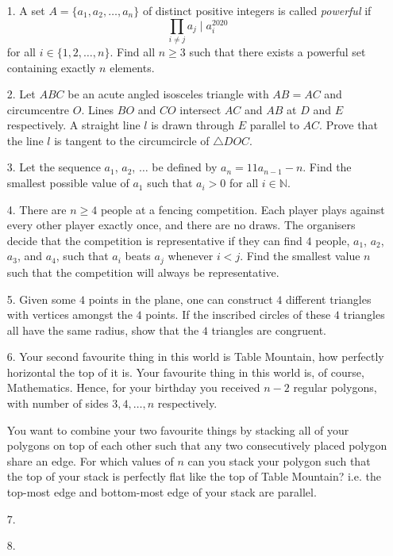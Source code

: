 \documentclass{article}
\begin{document}
\begin{enumerate}

\bigskip
\item[1.] %
A set $A = \{a_1, a_2, \dotsc, a_n\}$ of distinct positive integers is called \emph{powerful} if
\[ \prod_{i \neq j} a_j \mid a_i^{2020} \]
for all $i \in \{1, 2, \dotsc, n\}$.
Find all $n \ge 3$ such that there exists a powerful set containing exactly $n$ elements.


\medskip
\item[2.] %
Let $ABC$ be an acute angled isosceles triangle with $AB = AC$ and circumcentre $O$.
Lines $BO$ and $CO$ intersect $AC$ and $AB$ at $D$ and $E$ respectively.
A straight line $l$ is drawn through $E$ parallel to $AC$.
Prove that the line $l$ is tangent to the circumcircle of $\triangle DOC$.


\medskip
\item[3.] %
Let the sequence $a_1$, $a_2$, $\dotsc$ be defined by $a_n = 11 a_{n - 1} - n$.
Find the smallest possible value of $a_1$ such that $a_i > 0$ for all $i \in \mathbb{N}$.


\medskip
\item[4.] %
There are $n \ge 4$ people at a fencing competition.
Each player plays against every other player exactly once, and there are no draws.
The organisers decide that the competition is representative if they can find $4$ people, $a_1$, $a_2$, $a_3$, and $a_4$, such that $a_i$ beats $a_j$ whenever $i < j$.
Find the smallest value $n$ such that the competition will always be representative.


\medskip
\item[5.] %
Given some $4$ points in the plane, one can construct $4$ different triangles with vertices amongst the $4$ points. If the inscribed circles
of these $4$ triangles all have the same radius, show that the $4$ triangles are congruent. 


\medskip
\item[6.] %
Your second favourite thing in this world is Table Mountain, how perfectly horizontal the top of it is.
Your favourite thing in this world is, of course, Mathematics.
Hence, for your birthday you received $n-2$ regular polygons, with number of sides $3, 4, \dotsc, n$ respectively.

You want to combine your two favourite things by stacking all of your polygons on top of each other such that any two consecutively placed polygon share an edge.
For which values of $n$ can you stack your polygon such that the top of your stack is perfectly flat like the top of Table Mountain?
i.e. the top-most edge and bottom-most edge of your stack are parallel.


\medskip
\item[7.] %


\medskip
\item[8.] %

\end{enumerate}
\end{document}
